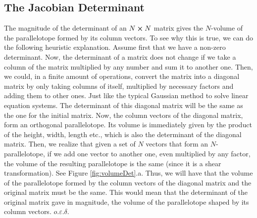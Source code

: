 \documentclass[11pt, a4paper]{article} %
\begin{document}
\subsection*{ The Jacobian Determinant\vspace{-0.3cm}}
The magnitude of the determinant of an $N\cross N$ matrix gives the $N$-volume of the parallelotope formed by its column vectors. To see why this is true, we can do the following heuristic explanation. Assume first that we have a non-zero determinant. Now, the determinant of a matrix does not change if we take a column of the matrix multiplied by any number and sum it to another one. Then, we could, in a finite amount of operations, convert the matrix into a diagonal matrix by only taking columns of itself, multiplied by necessary factors and adding them to other ones. Just like the typical Gaussian method to solve linear equation systems. The determinant of this diagonal matrix will be the same as the one for the initial matrix. Now, the column vectors of the diagonal matrix, form an orthogonal parallelotope. Its volume is immediately given by the product of the height, width, length etc., which is also the determinant of the diagonal matrix. Then, we realize that given a set of $N$ vectors that form an $N$-parallelotope, if we add one vector to another one, even multiplied by any factor, the volume of the resulting parallelotope is the same (since it is a shear transformation). See Figure \ref{fig:volumeDet}.a. Thus, we will have that the volume of the parallelotope formed by the column vectors of the diagonal matrix and the original matrix must be the same. This would mean that the determinant of the original matrix gave in magnitude, the volume of the parallelotope shaped by its column vectors. $o.\varepsilon.\delta$.\vspace{-0.1cm}
\end{document}
